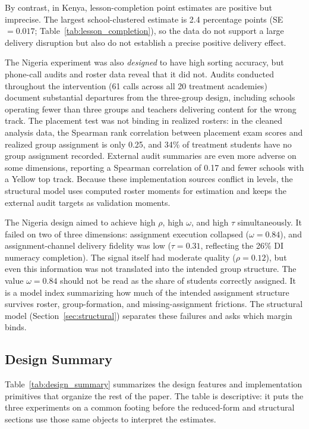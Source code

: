 \documentclass[11pt]{article}
\begin{document}
By contrast, in Kenya, lesson-completion point estimates are positive but imprecise. The largest school-clustered estimate is 2.4 percentage points (SE $=0.017$; Table~\ref{tab:lesson_completion}), so the data do not support a large delivery disruption but also do not establish a precise positive delivery effect.

The Nigeria experiment was also \emph{designed} to have high sorting accuracy, but phone-call audits and roster data reveal that it did not. Audits conducted throughout the intervention (61 calls across all 20 treatment academies) document substantial departures from the three-group design, including schools operating fewer than three groups and teachers delivering content for the wrong track. The placement test was not binding in realized rosters: in the cleaned analysis data, the Spearman rank correlation between placement exam scores and realized group assignment is only 0.25, and 34\% of treatment students have no group assignment recorded. External audit summaries are even more adverse on some dimensions, reporting a Spearman correlation of 0.17 and fewer schools with a Yellow top track. Because these implementation sources conflict in levels, the structural model uses computed roster moments for estimation and keeps the external audit targets as validation moments.

The Nigeria design aimed to achieve high $\rho$, high $\omega$, and high $\tau$ simultaneously. It failed on two of three dimensions: assignment execution collapsed ($\omega = 0.84$), and assignment-channel delivery fidelity was low ($\tau = 0.31$, reflecting the 26\% DI numeracy completion). The signal itself had moderate quality ($\rho = 0.12$), but even this information was not translated into the intended group structure. The value $\omega=0.84$ should not be read as the share of students correctly assigned. It is a model index summarizing how much of the intended assignment structure survives roster, group-formation, and missing-assignment frictions. The structural model (Section~\ref{sec:structural}) separates these failures and asks which margin binds.

\subsection{Design Summary}

Table~\ref{tab:design_summary} summarizes the design features and implementation primitives that organize the rest of the paper. The table is descriptive: it puts the three experiments on a common footing before the reduced-form and structural sections use those same objects to interpret the estimates.
\end{document}
